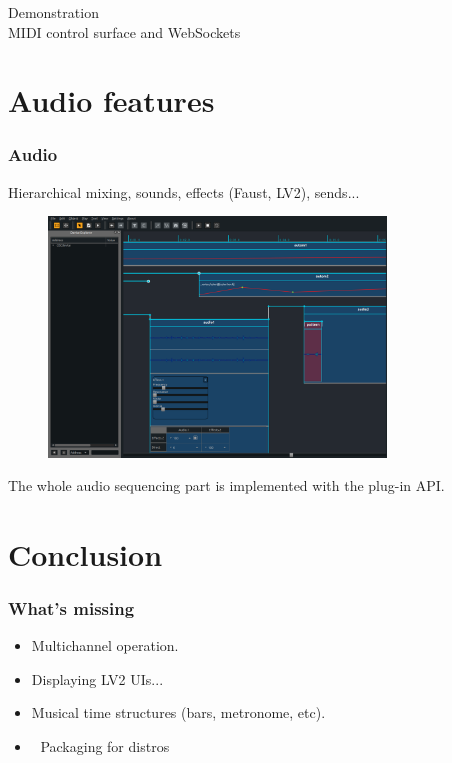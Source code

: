 \documentclass[handout]{beamer}
\begin{document}
\begin{frame}
\centering
\Huge Demonstration
~\\
\Large MIDI control surface and WebSockets
\end{frame}

\section{Audio features}
\begin{frame}
\frametitle{Audio}
\Large
Hierarchical mixing, sounds, effects (Faust, LV2), sends...
\begin{figure}
\includegraphics[width=0.8\textwidth]{images/audio.png}
\end{figure}
\end{frame}

\begin{frame}
\Large
\centering
The whole audio sequencing part is implemented with the plug-in API.
\end{frame}

\section{Conclusion}

\begin{frame}
\frametitle{What's missing}
\Large
\begin{itemize}
    \item<1> Multichannel operation.
    \item<2> Displaying LV2 UIs...
    \item<3> Musical time structures (bars, metronome, etc).
    \item<4> {\Huge \setsansfont{Symbola} 🙏} Packaging for distros {\Huge \setsansfont{Symbola} 🙏}
\end{itemize}
\end{frame}
\end{document}
